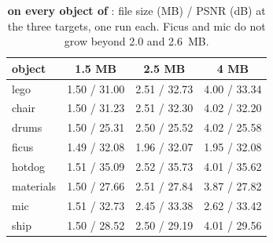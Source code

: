\begin{table}[!htb]\centering\footnotesize
\caption{\textbf{\BM on every object of \NeRFSyn}: file size (MB) / PSNR (dB) at the three targets, one run each. Ficus and mic do not grow beyond 2.0 and 2.6~MB.}
\label{sup:tab:objects}
\begin{tabular}{@{}lccc@{}}
\toprule
object & 1.5 MB & 2.5 MB & 4 MB \\
\midrule
lego & 1.50 / 31.00 & 2.51 / 32.73 & 4.00 / 33.34 \\
chair & 1.50 / 31.23 & 2.51 / 32.30 & 4.02 / 32.20 \\
drums & 1.50 / 25.31 & 2.50 / 25.52 & 4.02 / 25.58 \\
ficus & 1.49 / 32.08 & 1.96 / 32.07 & 1.95 / 32.08 \\
hotdog & 1.51 / 35.09 & 2.52 / 35.73 & 4.01 / 35.62 \\
materials & 1.50 / 27.66 & 2.51 / 27.84 & 3.87 / 27.82 \\
mic & 1.51 / 32.73 & 2.45 / 33.38 & 2.62 / 33.42 \\
ship & 1.50 / 28.52 & 2.50 / 29.19 & 4.01 / 29.56 \\
\bottomrule
\end{tabular}
\end{table}

